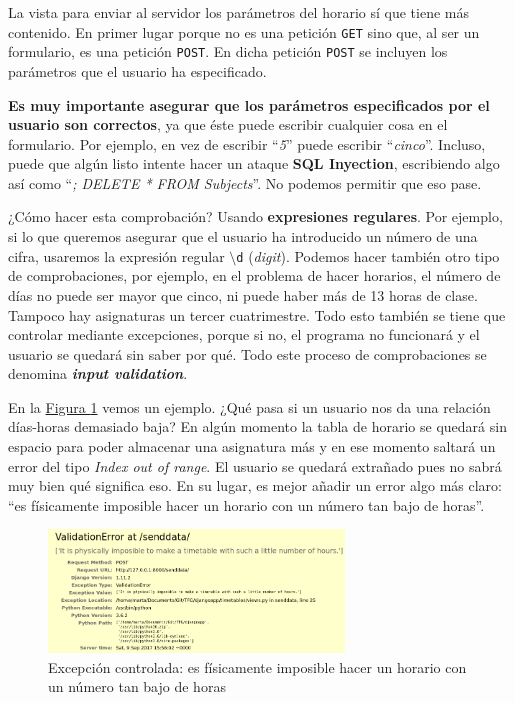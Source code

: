 La vista para enviar al servidor los parámetros del horario sí que tiene más contenido. En primer lugar porque no es una petición \texttt{GET} sino que, al ser un formulario, es una petición \texttt{POST}. En dicha petición \texttt{POST} se incluyen los parámetros que el usuario ha especificado. 

\textbf{Es muy importante asegurar que los parámetros especificados por el usuario son correctos}, ya que éste puede escribir cualquier cosa en el formulario. Por ejemplo, en vez de escribir ``\textit{5}'' puede escribir ``\textit{cinco}''. Incluso, puede que algún listo intente hacer un ataque \textbf{SQL Inyection}, escribiendo algo así como ``\textit{; DELETE * FROM Subjects}''. No podemos permitir que eso pase. 

¿Cómo hacer esta comprobación? Usando \textbf{expresiones regulares}. Por ejemplo, si lo que queremos asegurar que el usuario ha introducido un número de una cifra, usaremos la expresión regular \texttt{$\setminus$d} (\textit{digit}). Podemos hacer también otro tipo de comprobaciones, por ejemplo, en el problema de hacer horarios, el número de días no puede ser mayor que cinco, ni puede haber más de 13 horas de clase. Tampoco hay asignaturas un tercer cuatrimestre. Todo esto también se tiene que controlar mediante excepciones, porque si no, el programa no funcionará y el usuario se quedará sin saber por qué. Todo este proceso de comprobaciones se denomina \textbf{\textit{input validation}}.

En la \hyperref[exception]{Figura \ref*{exception}} vemos un ejemplo. ¿Qué pasa si un usuario nos da una relación días-horas demasiado baja? En algún momento la tabla de horario se quedará sin espacio para poder almacenar una asignatura más y en ese momento saltará un error del tipo \textit{Index out of range}. El usuario se quedará extrañado pues no sabrá muy bien qué significa eso. En su lugar, es mejor añadir un error algo más claro: ``es físicamente imposible hacer un horario con un número tan bajo de horas''. 

\begin{figure}
\centering
\includegraphics[width=0.7\textwidth]{img/ValidationError}
\caption{Excepción controlada: es físicamente imposible hacer un horario con un número tan bajo de horas}
\label{exception}
\end{figure}

